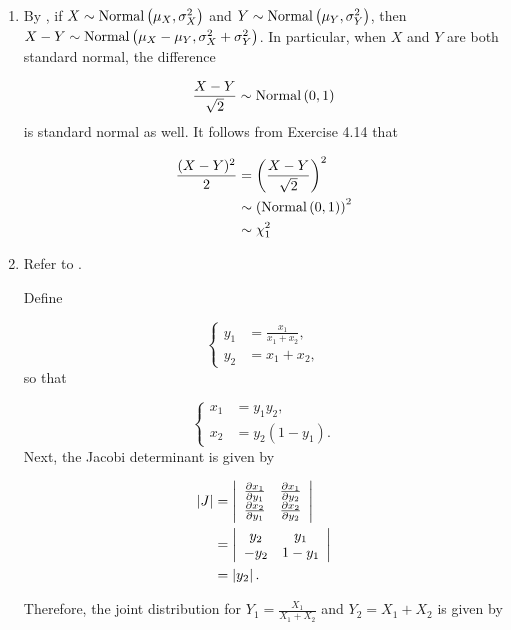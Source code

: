 \documentclass[12pt,letterpaper,reqno]{amsart}
\numberwithin{equation}{subsection}
\begin{document}
\begin{enumerate}[label=(\alph*),leftmargin=*]
    \item By \cite[Theorem 4.2.14 on page 156]{Berger-Casella}, if $X \sim \operatorname{Normal}\left( {\mu_X, \sigma_X^2} \right)$ and $Y \sim \operatorname{Normal}\left( {\mu_Y, \sigma_Y^2} \right)$, then $X-Y \sim \operatorname{Normal}\left( {\mu_X - \mu_Y, \sigma_X^2 + \sigma_Y^2} \right)$. In particular, when $X$ and $Y$ are both standard normal, the difference

\[ \frac{X-Y}{\sqrt{2}} \sim \operatorname{Normal}\left( {0, 1} \right) \]
is standard normal as well. It follows from Exercise 4.14 that

\begin{align*}
    \frac{(X-Y)^2}{2} &= \left( \frac{X-Y}{\sqrt{2}} \right)^2 \\
    &\sim \left( \operatorname{Normal}\left( {0, 1} \right) \right)^2 \\
    &\sim \chi_1^2
\end{align*}

    \item Refer to \cite[page 158]{Berger-Casella}.
    
    Define
    
    \[ \left\{ \begin{array}{cl}
         y_1 &= \frac{x_1}{x_1 + x_2}, \\
        y_2 &= x_1 + x_2,
    \end{array} \right. \]
    so that
    
    \[ \left\{ \begin{array}{cl}
        x_1 &= y_1 y_2, \\
        x_2 &= y_2 (1-y_1).
    \end{array} \right. \]
    Next, the Jacobi determinant is given by
    
    \begin{align*}
        \left\lvert{J}\right\rvert &= \left| \begin{array}{cc}
             \frac{\partial {x_1}}{\partial {y_1}} & \frac{\partial {x_1}}{\partial {y_2}} \\
             \frac{\partial {x_2}}{\partial {y_1}} & \frac{\partial {x_2}}{\partial {y_2}}
        \end{array} \right| \\
        &= \left\vert \begin{array}{cc}
             y_2 & y_1 \\
             -y_2 & 1-y_1
        \end{array} \right\vert \\
        &= \left\lvert{y_2}\right\rvert.
    \end{align*}
    
    Therefore, the joint distribution for $Y_1 = \frac{X_1}{X_1 + X_2}$ and $Y_2 = X_1 + X_2$ is given by
    

\end{enumerate}
\end{document}
